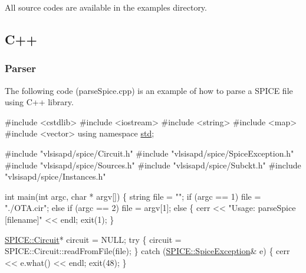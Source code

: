 All source codes are available in the {\ttfamily examples} directory.\hypertarget{spice_spiceC}{}\subsection{C++}\label{spice_spiceC}
\hypertarget{spice_spiceParseC}{}\subsubsection{Parser}\label{spice_spiceParseC}
The following code ({\ttfamily parse\+Spice.\+cpp}) is an example of how to parse a S\+P\+I\+CE file using C++ library. 
\begin{DoxyCodeInclude}
\textcolor{preprocessor}{#include <cstdlib>}
\textcolor{preprocessor}{#include <iostream>}
\textcolor{preprocessor}{#include <string>}
\textcolor{preprocessor}{#include <map>}
\textcolor{preprocessor}{#include <vector>}
\textcolor{keyword}{using namespace }\mbox{\hyperlink{namespacestd}{std}};

\textcolor{preprocessor}{#include "vlsisapd/spice/Circuit.h"}
\textcolor{preprocessor}{#include "vlsisapd/spice/SpiceException.h"}
\textcolor{preprocessor}{#include "vlsisapd/spice/Sources.h"}
\textcolor{preprocessor}{#include "vlsisapd/spice/Subckt.h"}
\textcolor{preprocessor}{#include "vlsisapd/spice/Instances.h"}

\textcolor{keywordtype}{int} main(\textcolor{keywordtype}{int} argc, \textcolor{keywordtype}{char} * argv[]) \{
    \textcolor{keywordtype}{string} file = \textcolor{stringliteral}{""};
    \textcolor{keywordflow}{if} (argc == 1)
        file = \textcolor{stringliteral}{"./OTA.cir"};
    \textcolor{keywordflow}{else} \textcolor{keywordflow}{if} (argc == 2)
        file = argv[1];
    \textcolor{keywordflow}{else} \{
        cerr << \textcolor{stringliteral}{"Usage: parseSpice [filename]"} << endl;
        exit(1);
    \}

    \mbox{\hyperlink{class_s_p_i_c_e_1_1_circuit}{SPICE::Circuit}}* circuit = NULL;
    \textcolor{keywordflow}{try} \{
        circuit = SPICE::Circuit::readFromFile(file);
    \} \textcolor{keywordflow}{catch} (\mbox{\hyperlink{class_s_p_i_c_e_1_1_spice_exception}{SPICE::SpiceException}}& e) \{
        cerr << e.what() << endl;
        exit(48);
    \}


\end{DoxyCodeInclude}
